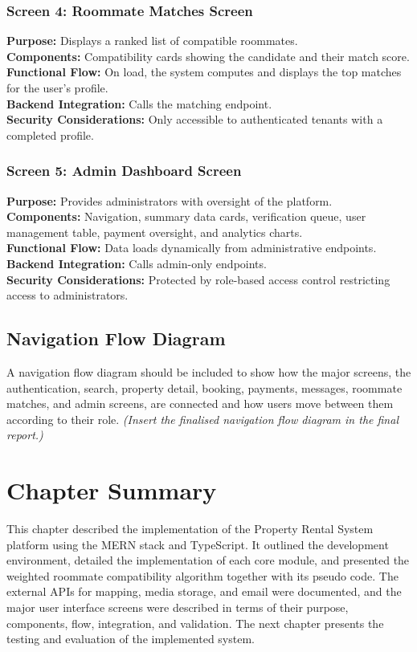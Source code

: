 \subsubsection{Screen 4: Roommate Matches Screen}

\textbf{Purpose:} Displays a ranked list of compatible roommates. \\
\textbf{Components:} Compatibility cards showing the candidate and their match score. \\
\textbf{Functional Flow:} On load, the system computes and displays the top matches for the user's profile. \\
\textbf{Backend Integration:} Calls the matching endpoint. \\
\textbf{Security Considerations:} Only accessible to authenticated tenants with a completed profile.

\subsubsection{Screen 5: Admin Dashboard Screen}

\textbf{Purpose:} Provides administrators with oversight of the platform. \\
\textbf{Components:} Navigation, summary data cards, verification queue, user management table, payment oversight, and analytics charts. \\
\textbf{Functional Flow:} Data loads dynamically from administrative endpoints. \\
\textbf{Backend Integration:} Calls admin-only endpoints. \\
\textbf{Security Considerations:} Protected by role-based access control restricting access to administrators.

\subsection{Navigation Flow Diagram}

A navigation flow diagram should be included to show how the major screens, the authentication, search, property detail, booking, payments, messages, roommate matches, and admin screens, are connected and how users move between them according to their role. \textit{(Insert the finalised navigation flow diagram in the final report.)}

\section{Chapter Summary}

This chapter described the implementation of the Property Rental System platform using the MERN
stack and TypeScript. It outlined the development environment, detailed the
implementation of each core module, and presented the weighted roommate
compatibility algorithm together with its pseudo code. The external APIs for
mapping, media storage, and email were documented, and the major user interface
screens were described in terms of their purpose, components, flow, integration,
and validation. The next chapter presents the testing and evaluation of the
implemented system.
